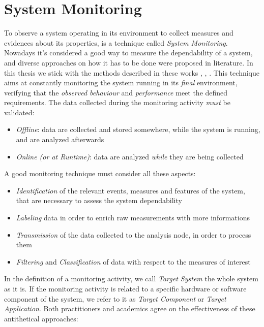 \section{System Monitoring}

To observe a system operating in its environment to collect measures and evidences about its properties, is a technique called \textsl{System Monitoring}. Nowadays it's considered a good way to measure the dependability of a system, and diverse approaches on how it has to be done were proposed in literature. In this thesis we stick with the methods described in these works \cite{monitor1}, \cite{monitor2}, \cite{monitor3}.
This technique aims at constantly monitoring the system running in its \textsl{final} environment, verifying that the \textsl{observed behaviour} and \textsl{performance} meet the defined requirements.
The data collected during the monitoring activity \textsl{must} be validated:

\begin{itemize}
	\item \textsl{Offline}: data are collected and stored somewhere, while the system is running, and are analyzed afterwards
	\item \textsl{Online (or at Runtime)}: data are analyzed \textsl{while} they are being collected
\end{itemize}

A good monitoring technique must consider all these aspects:

\begin{itemize}
	\item \textsl{Identification} of the relevant events, measures and features of the system, that are necessary to assess the system dependability
	\item \textsl{Labeling} data in order to enrich raw measurements with more informations
	\item \textsl{Transmission} of the data collected to the analysis node, in order to process them
	\item \textsl{Filtering} and \textsl{Classification} of data with respect to the measures of interest
\end{itemize}

In the definition of a monitoring activity, we call \textsl{Target System} the whole system as it is. If the monitoring activity is related to a specific hardware or software component of the system, we refer to it as \textsl{Target Component} or \textsl{Target Application}. Both practitioners and academics agree on the effectiveness of these antithetical approaches:

